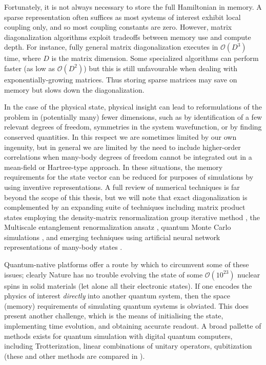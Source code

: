 	Fortunately, it is not always necessary to store the full Hamiltonian in memory.
	A sparse representation often suffices as most systems of interest exhibit local coupling only, and so most coupling constants are zero.
	However, matrix diagonalization algorithms exploit tradeoffs between memory use and compute depth.
	For instance, fully general matrix diagonalization executes in $\mathcal{O}(D^{3})$ time, where $D$ is the matrix dimension.
	Some specialized algorithms can perform faster (as low as $\mathcal{O}(D^{2})$) but this is still unfavourable when dealing with exponentially-growing matrices.
	Thus storing sparse matrices may save on memory but slows down the diagonalization.

	In the case of the physical state, physical insight can lead to reformulations of the problem in (potentially many) fewer dimensions, such as by identification of a few relevant degrees of freedom, symmetries in the system wavefunction, or by finding conserved quantities.
	In this respect we are sometimes limited by our own ingenuity, but in general we are limited by the need to include higher-order correlations when many-body degrees of freedom cannot be integrated out in a mean-field or Hartree-type approach.
	In these situations, the memory requirements for the state vector can  be reduced for purposes of simulations by using inventive representations.
	A full review of numerical techniques is far beyond the scope of this thesis, but we will note that exact diagonalization \cite{Zhang10} is complemented by an expanding suite of techniques including matrix product states \cite{Schollwock11} employing the density-matrix renormalization group iterative method \cite{Dechiara08}, the Multiscale entanglement renormalization ansatz \cite{Evenbly15}, quantum Monte Carlo simulations \cite{BeccaQMC}, and emerging techniques using artificial neural network representations of many-body states \cite{Carleo17}.

	Quantum-native platforms offer a route by which to circumvent some of these issues; clearly Nature has no trouble evolving the state of some $\mathcal{O}(10^{23})$ nuclear spins in solid materials (let alone all their electronic states).
	If one encodes the physics of interest \emph{directly} into another quantum system, then the space (memory) requirements of simulating quantum systems is obviated.
	This does present another challenge, which is the means of initialising the state, implementing time evolution, and obtaining accurate readout.
	A broad pallette of methods exists for quantum simulation with digital quantum computers, including Trotterization, linear combinations of unitary operators, qubitization (these and other methods are compared in \cite{Low19}).

